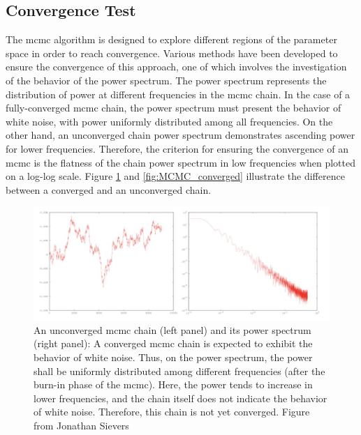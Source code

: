 \documentclass[12pt, TexShade, letterpaper]{report}
\begin{document}
\subsection{Convergence Test}
\label{chap:method,sub:mcmc,subsub:convergence}
The \gls{mcmc} algorithm is designed to explore different regions of the parameter space in order to reach convergence. Various methods have been developed to ensure the convergence of this approach, one of which involves the investigation of the behavior of the power spectrum. The power spectrum represents the distribution of power at different frequencies in the \gls{mcmc} chain. In the case of a fully-converged \gls{mcmc} chain, the power spectrum must present the behavior of white noise, with power uniformly distributed among all frequencies. On the other hand, an unconverged chain power spectrum demonstrates ascending power for lower frequencies. Therefore, the criterion for ensuring the convergence of an \gls{mcmc} is the flatness of the chain power spectrum in low frequencies when plotted on a log-log scale. Figure \ref{fig:MCMC_unconverged} and \ref{fig:MCMC_converged} illustrate the difference between a converged and an unconverged chain.\par
\begin{figure}[h!]
\centering
\includegraphics[scale =0.9]{mcmc_uncoverged.jpg}
\caption[An unconverged \gls{mcmc} chain and its power spectrum]{An unconverged \gls{mcmc} chain (left panel) and its power spectrum (right panel): A converged \gls{mcmc} chain is expected to exhibit the behavior of white noise. Thus, on the power spectrum, the power shall be uniformly distributed among different frequencies (after the burn-in phase of the \gls{mcmc}). Here, the power tends to increase in lower frequencies, and the chain itself does not indicate the behavior of white noise. Therefore, this chain is not yet converged. Figure from Jonathan Sievers \cite{mcmc_convergence_plot}}
\label{fig:MCMC_unconverged}
\end{figure}
\end{document}
